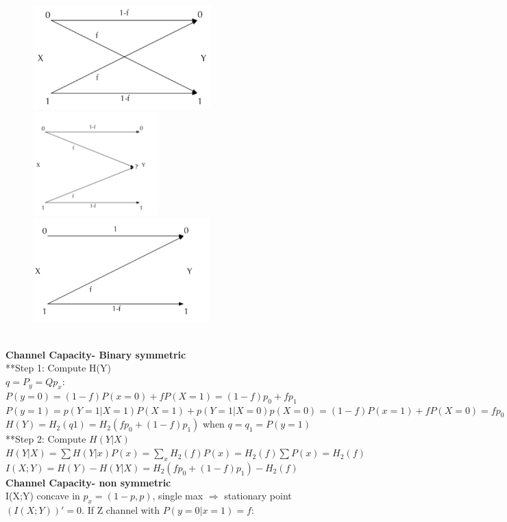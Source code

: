 \documentclass[12pt,a4paper]{extarticle}
\begin{document}
\begin{figure}[h]
  \includegraphics[width=0.5\linewidth, height=4cm]{img/lec17_0}
  \includegraphics[width=0.5\linewidth, height=4cm]{img/lec17_1}
  \includegraphics[width=0.5\linewidth, height=4cm]{img/lec17_2}
\end{figure}\\
\newline
\textbf{Channel Capacity- Binary symmetric}\\
**Step 1: Compute H(Y)\\
$q = P_y = Qp_x$:\\
$P(y=0)=(1-f)P(x=0)+fP(X=1)=(1-f)p_0+fp_1$\\
$P(y=1)=p(Y=1|X=1)P(X=1)+p(Y=1|X=0)p(X=0)=(1-f)P(x=1)+fP(X=0)=fp_0+(1-f)p_1$\\
$H(Y) = H_2(q1)=H_2(fp_0+(1-f)p_1)$ when $q=q_1=P(y=1)$\\
**Step 2: Compute $H(Y|X)$\\
$H(Y|X)=\sum H(Y|x)P(x) = \sum_x H_2(f)P(x)=H_2(f)\sum P(x)=H_2(f)$
$I(X;Y) =H(Y)-H(Y|X)=H_2(fp_0+(1-f)p_1)-H_2(f)$ \\
\newline
\textbf{Channel Capacity- non symmetric}\\
I(X;Y) concave in $p_x=(1-p,p)$, single max $\Rightarrow$ stationary point $(I(X;Y))'=0$. If Z channel with $P(y=0|x=1)=f$:\\
\end{document}
